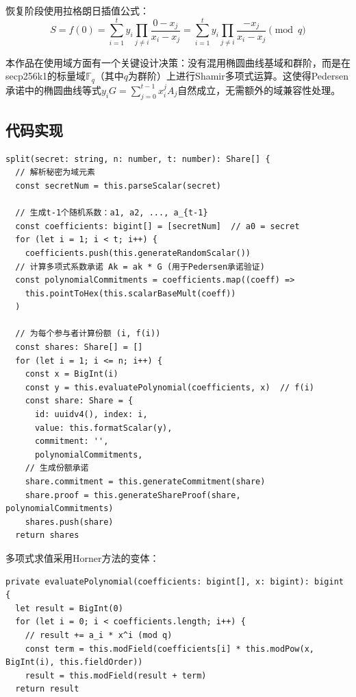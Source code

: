 \documentclass[UTF8,a4paper,zihao=-4,openany]{ctexrep}
\begin{document}
恢复阶段使用拉格朗日插值公式：
\[
S = f(0) = \sum_{i=1}^{t} y_i \prod_{j \neq i} \frac{0-x_j}{x_i-x_j} = \sum_{i=1}^{t} y_i \prod_{j \neq i} \frac{-x_j}{x_i-x_j} \pmod{q}
\]

本作品在使用域方面有一个关键设计决策：没有混用椭圆曲线基域和群阶，而是在secp256k1的标量域$\mathbb{F}_q$（其中$q$为群阶）上进行Shamir多项式运算。这使得Pedersen承诺中的椭圆曲线等式$y_iG=\sum_{j=0}^{t-1}x_i^jA_j$自然成立，无需额外的域兼容性处理。

\subsection{代码实现}

\begin{lstlisting}[caption={Shamir秘密共享拆分实现 (shamir.ts:61-91)}]
split(secret: string, n: number, t: number): Share[] {
  // 解析秘密为域元素
  const secretNum = this.parseScalar(secret)

  // 生成t-1个随机系数：a1, a2, ..., a_{t-1}
  const coefficients: bigint[] = [secretNum]  // a0 = secret
  for (let i = 1; i < t; i++) {
    coefficients.push(this.generateRandomScalar())
  // 计算多项式系数承诺 Ak = ak * G (用于Pedersen承诺验证)
  const polynomialCommitments = coefficients.map((coeff) =>
    this.pointToHex(this.scalarBaseMult(coeff))
  )

  // 为每个参与者计算份额 (i, f(i))
  const shares: Share[] = []
  for (let i = 1; i <= n; i++) {
    const x = BigInt(i)
    const y = this.evaluatePolynomial(coefficients, x)  // f(i)
    const share: Share = {
      id: uuidv4(), index: i,
      value: this.formatScalar(y),
      commitment: '',
      polynomialCommitments,
    // 生成份额承诺
    share.commitment = this.generateCommitment(share)
    share.proof = this.generateShareProof(share, polynomialCommitments)
    shares.push(share)
  return shares
\end{lstlisting}

多项式求值采用Horner方法的变体：

\begin{lstlisting}[caption={多项式求值实现 (shamir.ts:241-248)}]
private evaluatePolynomial(coefficients: bigint[], x: bigint): bigint {
  let result = BigInt(0)
  for (let i = 0; i < coefficients.length; i++) {
    // result += a_i * x^i (mod q)
    const term = this.modField(coefficients[i] * this.modPow(x, BigInt(i), this.fieldOrder))
    result = this.modField(result + term)
  return result
\end{lstlisting}
\end{document}
